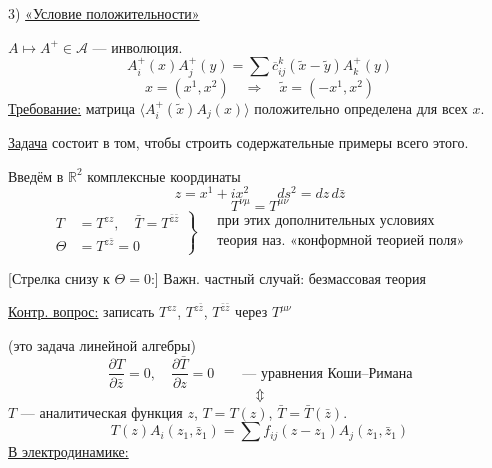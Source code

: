 3) \underline{«Условие положительности»}

$A\mapsto A^+\in\mathcal A$ — инволюция.
\begin{equation*}
A_i^+(x)A_j^+(y)=\sum\overline{c}_{ij}^k(\widetilde x-\widetilde y)A_k^+(y)
\tag{8}
\end{equation*}
\begin{equation*}
x=(x^1,x^2)\quad\Rightarrow\quad\widetilde x=(-x^1,x^2)
\end{equation*}
\underline{Требование:} матрица $\langle A_i^+(\widetilde x)A_j(x)\rangle$
положительно определена для всех $x$.

\underline{Задача} состоит в том, чтобы строить содержательные примеры всего этого.


Введём в $\mathbb R^2$ комплексные координаты
\begin{equation*}
z=x^1+ix^2\qquad ds^2=dz\,d\bar z
\end{equation*}
\begin{equation*}
T^{\nu\mu}=T^{\mu\nu}
\tag{9}
\end{equation*}
\begin{equation*}
\left.\begin{aligned}
T&=T^{zz},\quad\bar T=T^{\bar z\bar z}\\
\Theta&=T^{z\bar z}=0
\end{aligned}\right\}
\quad\begin{gathered}
\text{при этих дополнительных условиях}\\
\text{теория наз. «конформной теорией поля»}
\end{gathered}
\tag{10}
\end{equation*}

[Стрелка снизу к $\Theta=0$:] Важн. частный случай: безмассовая теория

\underline{Контр. вопрос:} записать $T^{zz}$, $T^{z\bar z}$, $T^{\bar z\bar z}$ через $T^{\mu\nu}$

(это задача линейной алгебры)
\begin{equation*}
\frac{\partial T}{\partial\bar z}=0,\quad
\frac{\partial\bar T}{\partial z}=0
\qquad\text{— уравнения Коши--Римана}
\tag{11}
\end{equation*}
\begin{equation*}
\Updownarrow
\end{equation*}
$T$ — аналитическая функция $z$, $T=T(z)$, $\bar T=\bar T(\bar z)$.
\begin{equation*}
T(z)A_i(z_1,\bar z_1)=\sum f_{ij}(z-z_1)A_j(z_1,\bar z_1)
\tag{12}
\end{equation*}
\underline{В электродинамике:}

